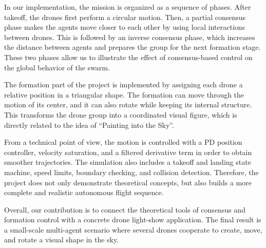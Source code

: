 In our implementation, the mission is organized as a sequence of phases. After takeoff, the drones first perform a circular motion. Then, a partial consensus phase makes the agents move closer to each other by using local interactions between drones. This is followed by an inverse consensus phase, which increases the distance between agents and prepares the group for the next formation stage. These two phases allow us to illustrate the effect of consensus-based control on the global behavior of the swarm.

The formation part of the project is implemented by assigning each drone a relative position in a triangular shape. The formation can move through the motion of its center, and it can also rotate while keeping its internal structure. This transforms the drone group into a coordinated visual figure, which is directly related to the idea of ``Painting into the Sky''.

From a technical point of view, the motion is controlled with a PD position controller, velocity saturation, and a filtered derivative term in order to obtain smoother trajectories. The simulation also includes a takeoff and landing state machine, speed limits, boundary checking, and collision detection. Therefore, the project does not only demonstrate theoretical concepts, but also builds a more complete and realistic autonomous flight sequence.

Overall, our contribution is to connect the theoretical tools of consensus and formation control with a concrete drone light-show application. The final result is a small-scale multi-agent scenario where several drones cooperate to create, move, and rotate a visual shape in the sky.




